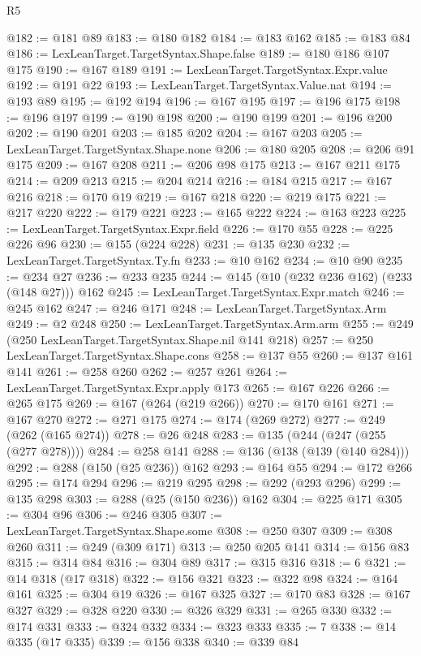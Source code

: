 \begin{lexlean}{R5}
\begin{coremodule}
{{{{{{{{{{{{{{{{{{{{{{{{{{{{{{{{{{{{{{{{{{{{{{{{{{{{{{{{{{{{{{@182 := @181 @89
@183 := @180 @182
@184 := @183 @162
@185 := @183 @84
@186 := LexLeanTarget.TargetSyntax.Shape.false
@189 := @180 @186 @107 @175
@190 := @167 @189
@191 := LexLeanTarget.TargetSyntax.Expr.value
@192 := @191 @22
@193 := LexLeanTarget.TargetSyntax.Value.nat
@194 := @193 @89
@195 := @192 @194
@196 := @167 @195
@197 := @196 @175
@198 := @196 @197
@199 := @190 @198
@200 := @190 @199
@201 := @196 @200
@202 := @190 @201
@203 := @185 @202
@204 := @167 @203
@205 := LexLeanTarget.TargetSyntax.Shape.none
@206 := @180 @205
@208 := @206 @91 @175
@209 := @167 @208
@211 := @206 @98 @175
@213 := @167 @211 @175
@214 := @209 @213
@215 := @204 @214
@216 := @184 @215
@217 := @167 @216
@218 := @170 @19
@219 := @167 @218
@220 := @219 @175
@221 := @217 @220
@222 := @179 @221
@223 := @165 @222
@224 := @163 @223
@225 := LexLeanTarget.TargetSyntax.Expr.field
@226 := @170 @55
@228 := @225 @226 @96
@230 := @155 (@224 @228)
@231 := @135 @230
@232 := LexLeanTarget.TargetSyntax.Ty.fn
@233 := @10 @162
@234 := @10 @90
@235 := @234 @27
@236 := @233 @235
@244 := @145 (@10 (@232 @236 @162) (@233 (@148 @27))) @162
@245 := LexLeanTarget.TargetSyntax.Expr.match
@246 := @245 @162
@247 := @246 @171
@248 := LexLeanTarget.TargetSyntax.Arm
@249 := @2 @248
@250 := LexLeanTarget.TargetSyntax.Arm.arm
@255 := @249 (@250 LexLeanTarget.TargetSyntax.Shape.nil @141 @218)
@257 := @250 LexLeanTarget.TargetSyntax.Shape.cons
@258 := @137 @55
@260 := @137 @161 @141
@261 := @258 @260
@262 := @257 @261
@264 := LexLeanTarget.TargetSyntax.Expr.apply @173
@265 := @167 @226
@266 := @265 @175
@269 := @167 (@264 (@219 @266))
@270 := @170 @161
@271 := @167 @270
@272 := @271 @175
@274 := @174 (@269 @272)
@277 := @249 (@262 (@165 @274))
@278 := @26 @248
@283 := @135 (@244 (@247 (@255 (@277 @278))))
@284 := @258 @141
@288 := @136 (@138 (@139 (@140 @284)))
@292 := @288 (@150 (@25 @236)) @162
@293 := @164 @55
@294 := @172 @266
@295 := @174 @294
@296 := @219 @295
@298 := @292 (@293 @296)
@299 := @135 @298
@303 := @288 (@25 (@150 @236)) @162
@304 := @225 @171
@305 := @304 @96
@306 := @246 @305
@307 := LexLeanTarget.TargetSyntax.Shape.some
@308 := @250 @307
@309 := @308 @260
@311 := @249 (@309 @171)
@313 := @250 @205 @141
@314 := @156 @83
@315 := @314 @84
@316 := @304 @89
@317 := @315 @316
@318 := 6
@321 := @14 @318 (@17 @318)
@322 := @156 @321
@323 := @322 @98
@324 := @164 @161
@325 := @304 @19
@326 := @167 @325
@327 := @170 @83
@328 := @167 @327
@329 := @328 @220
@330 := @326 @329
@331 := @265 @330
@332 := @174 @331
@333 := @324 @332
@334 := @323 @333
@335 := 7
@338 := @14 @335 (@17 @335)
@339 := @156 @338
@340 := @339 @84
}}}}}}}}}}}}}}}}}}}}}}}}}}}}}}}}}}}}}}}}}}}}}}}}}}}}}}}}}}}}}}
\end{coremodule}
\end{lexlean}
